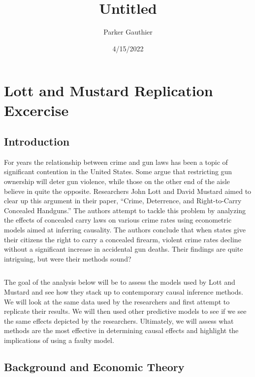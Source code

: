 \documentclass[
]{article}
\title{Untitled}
\author{Parker Gauthier}
\date{4/15/2022}
\begin{document}
\maketitle

\hypertarget{lott-and-mustard-replication-excercise}{%
\section{Lott and Mustard Replication
Excercise}\label{lott-and-mustard-replication-excercise}}

\hypertarget{introduction}{%
\subsection{Introduction}\label{introduction}}

For years the relationship between crime and gun laws has been a topic
of significant contention in the United States. Some argue that
restricting gun ownership will deter gun violence, while those on the
other end of the aisle believe in quite the opposite. Researchers John
Lott and David Mustard aimed to clear up this argument in their paper,
``Crime, Deterrence, and Right-to-Carry Concealed Handguns.'' The
authors attempt to tackle this problem by analyzing the effects of
concealed carry laws on various crime rates using econometric models
aimed at inferring causality. The authors conclude that when states give
their citizens the right to carry a concealed firearm, violent crime
rates decline without a significant increase in accidental gun deaths.
Their findings are quite intriguing, but were their methods sound?

\begin{verbatim}
\end{verbatim}

The goal of the analysis below will be to assess the models used by Lott
and Mustard and see how they stack up to contemporary causal inference
methods. We will look at the same data used by the researchers and first
attempt to replicate their results. We will then used other predictive
models to see if we see the same effects depicted by the researchers.
Ultimately, we will assess what methods are the most effective in
determining causal effects and highlight the implications of using a
faulty model.

\hypertarget{background-and-economic-theory}{%
\subsection{Background and Economic
Theory}\label{background-and-economic-theory}}
\end{document}
